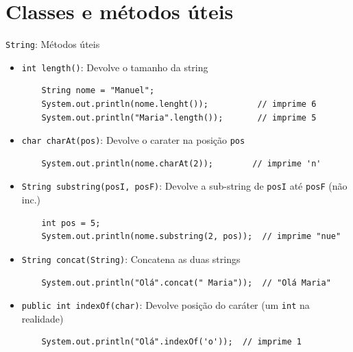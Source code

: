 \documentclass[portuguese, aspectratio=169, xcolor=table]{beamer}
\begin{document}
\section{Classes e métodos úteis}
\begin{frame}[fragile]{\texttt{String}: Métodos úteis}
\begin{itemize}
\item \texttt{int length()}: Devolve o tamanho da string
\begin{verbatim}
    String nome = "Manuel";
    System.out.println(nome.lenght());          // imprime 6
    System.out.println("Maria".length());       // imprime 5
\end{verbatim}
\item \texttt{char charAt(pos)}: Devolve o carater na posição \texttt{pos}
\begin{verbatim}
    System.out.println(nome.charAt(2));        // imprime 'n'
\end{verbatim}

\item \texttt{String substring(posI, posF)}: Devolve a sub-string de \texttt{posI} até \texttt{posF} (não inc.)
\begin{verbatim}
    int pos = 5;
    System.out.println(nome.substring(2, pos));  // imprime "nue"
\end{verbatim}

\item \texttt{String concat(String)}: Concatena as duas strings
\begin{verbatim}
    System.out.println("Olá".concat(" Maria"));  // "Olá Maria"
\end{verbatim}

\item \texttt{public int indexOf(char)}: Devolve posição do caráter (um \texttt{int} na realidade)
\begin{verbatim}
    System.out.println("Olá".indexOf('o'));  // imprime 1
\end{verbatim}
\end{itemize}
\end{frame}
\end{document}
